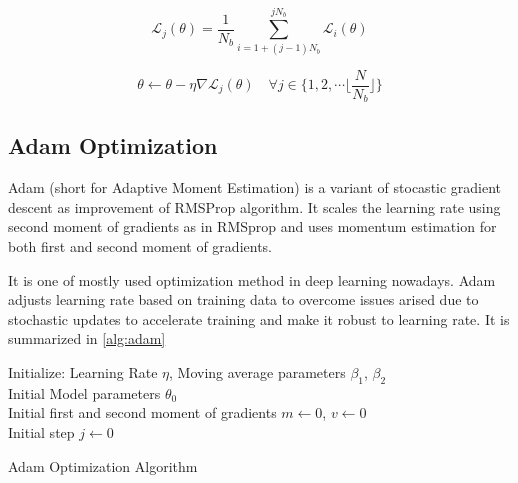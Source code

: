 \begin{equation}
\label{eqn:mb_summed_loss}
\mathcal{L}_j(\theta) = \frac{1}{N_b} \sum_{i=1 + (j-1) N_b}^{j N_b} \mathcal{L}_i(\theta) 
\end{equation}

\begin{equation}
\label{eqn:mb_grad_desc}
\theta \leftarrow \theta - \eta  \nabla \mathcal{L}_j(\theta) \quad \forall j \in \{1,2, \cdots \Big\lfloor\frac{N}{N_b}\Big\rfloor\}
\end{equation}

\subsection{Adam Optimization}

Adam \cite{kingma_adam_2017}  (short for Adaptive Moment Estimation) is a variant of stocastic gradient descent as improvement of RMSProp \cite{hinton_lecture_nodate} algorithm. It scales the learning rate using second moment of gradients as in RMSprop and uses momentum estimation for both first and second moment of gradients.

It is one of mostly used optimization method in deep learning nowadays. Adam adjusts learning rate based on training data to overcome issues arised due to stochastic updates to accelerate training and make it robust to learning rate. It is summarized in \ref{alg:adam} \\


\begin{algorithm}[H]
	\SetAlgoLined
	\DontPrintSemicolon %
	Initialize: Learning Rate $\eta$, Moving average parameters $\beta_1$, $\beta_2$\\
	Initial Model parameters $\theta_0$ \\
	Initial first and second moment of gradients $m \leftarrow 0$, $v \leftarrow 0$ \\
	Initial step $j \leftarrow 0$ \\
	\caption{Adam Optimization Algorithm}
	\label{alg:adam}
\end{algorithm}


